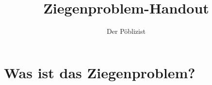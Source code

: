 \documentclass[a4paper]{article}
\title{Ziegenproblem-Handout}
\author{Der Pöblizist }
\begin{document}
\maketitle
\section{Was ist das Ziegenproblem?}

\scalebox{0.5}{
}
\end{document}
